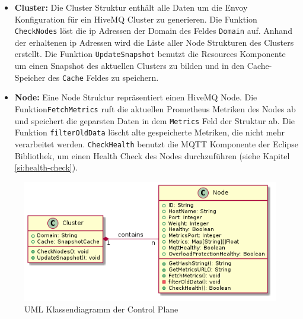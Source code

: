 \begin{itemize}
  \item \textbf{Cluster:} Die Cluster Struktur enthält alle Daten um die Envoy Konfiguration für ein HiveMQ Cluster zu generieren. Die Funktion \verb|CheckNodes| löst die \ac{ip} Adressen der Domain des Feldes \verb|Domain| auf. Anhand der erhaltenen \ac{ip} Adressen wird die Liste aller Node Strukturen des Clusters erstellt. Die Funktion \verb|UpdateSnapshot| benutzt die Resources Komponente um einen Snapshot des aktuellen Clusters zu bilden und in den Cache-Speicher des \verb|Cache| Feldes zu speichern.
  \item \textbf{Node:} Eine Node Struktur repräsentiert einen HiveMQ Node. Die Funktion\newline \verb|FetchMetrics| ruft die aktuellen Prometheus Metriken des Nodes ab und speichert die geparsten Daten in dem \verb|Metrics| Feld der Struktur ab. Die Funktion \verb|filterOldData| löscht alte gespeicherte Metriken, die nicht mehr verarbeitet werden. \verb|CheckHealth| benutzt die MQTT Komponente der Eclipse Bibliothek, um einen Health Check des Nodes durchzuführen (siehe Kapitel \ref{si:health-check}).
\end{itemize}

\begin{figure}
    \centering
    \includegraphics[scale=0.6]{gen/class.png}
    \caption{UML Klassendiagramm der Control Plane}
    \label{fig:class-diagram}
\end{figure}

